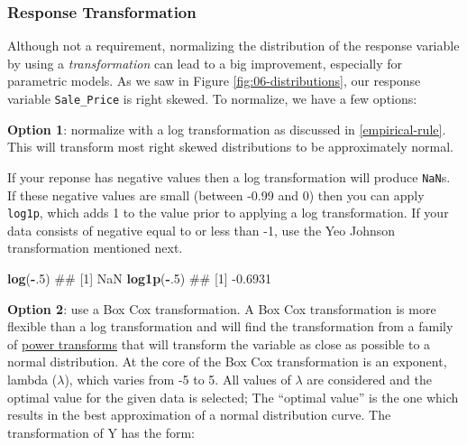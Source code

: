\documentclass[]{book}
\newenvironment{Shaded}{\begin{snugshade}}{\end{snugshade}}
\newcommand{\CommentTok}[1]{\textcolor[rgb]{0.56,0.35,0.01}{\textit{#1}}}
\newcommand{\DecValTok}[1]{\textcolor[rgb]{0.00,0.00,0.81}{#1}}
\newcommand{\KeywordTok}[1]{\textcolor[rgb]{0.13,0.29,0.53}{\textbf{#1}}}
\newcommand{\NormalTok}[1]{#1}
\newcommand{\OperatorTok}[1]{\textcolor[rgb]{0.81,0.36,0.00}{\textbf{#1}}}
\newcommand{\StringTok}[1]{\textcolor[rgb]{0.31,0.60,0.02}{#1}}
\theoremstyle{definition}
\theoremstyle{definition}
\theoremstyle{definition}
\theoremstyle{remark}
\begin{document}
\hypertarget{response-transformation}{%
\subsubsection{Response Transformation}\label{response-transformation}}

Although not a requirement, normalizing the distribution of the response
variable by using a \emph{transformation} can lead to a big improvement,
especially for parametric models. As we saw in Figure
\ref{fig:06-distributions}, our response variable \texttt{Sale\_Price}
is right skewed. To normalize, we have a few options:

\textbf{Option 1}: normalize with a log transformation as discussed in
\ref{empirical-rule}. This will transform most right skewed
distributions to be approximately normal.

\begin{Shaded}
\end{Shaded}

If your reponse has negative values then a log transformation will
produce \texttt{NaN}s. If these negative values are small (between -0.99
and 0) then you can apply \texttt{log1p}, which adds 1 to the value
prior to applying a log transformation. If your data consists of
negative equal to or less than -1, use the Yeo Johnson transformation
mentioned next.

\begin{Shaded}
\begin{Highlighting}[]
\KeywordTok{log}\NormalTok{(}\OperatorTok{-}\NormalTok{.}\DecValTok{5}\NormalTok{)}
\NormalTok{## [1] NaN}
\KeywordTok{log1p}\NormalTok{(}\OperatorTok{-}\NormalTok{.}\DecValTok{5}\NormalTok{)}
\NormalTok{## [1] -0.6931}
\end{Highlighting}
\end{Shaded}

\textbf{Option 2}: use a Box Cox transformation. A Box Cox
transformation is more flexible than a log transformation and will find
the transformation from a family of
\href{https://en.wikipedia.org/wiki/Power_transform\#Box\%E2\%80\%93Cox_transformation}{power
transforms} that will transform the variable as close as possible to a
normal distribution. At the core of the Box Cox transformation is an
exponent, lambda (\(\lambda\)), which varies from -5 to 5. All values of
\(\lambda\) are considered and the optimal value for the given data is
selected; The ``optimal value'' is the one which results in the best
approximation of a normal distribution curve. The transformation of Y
has the form:
\end{document}

